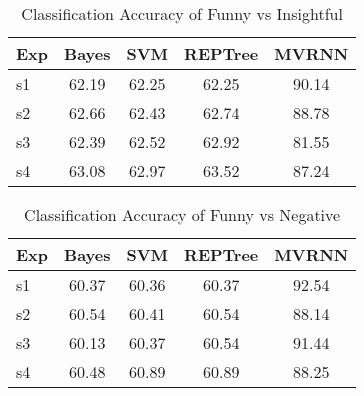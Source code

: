 \documentclass{acm_proc_article-sp}
\begin{document}
\begin{table}[t]
\caption{\label{}Classification Accuracy of Funny vs Insightful }

\vspace{8pt} %

\centering
\begin{tabular}{|l |c |c| c| c|}
\hline%
Exp & Bayes & SVM & REPTree & MVRNN  \\
                 
\hline

s1 & 62.19 & 62.25 &62.25 & 90.14 \\
\hline
s2 & 62.66 & 62.43 &62.74 & 88.78 \\
\hline
s3 & 62.39 & 62.52 &62.92 & 81.55 \\
\hline
s4 & 63.08 & 62.97 &63.52 & 87.24 \\
\hline



\end{tabular}
\end{table}



\begin{table}[t]
\caption{\label{}Classification Accuracy of Funny vs Negative }

\vspace{8pt} %

\centering
\begin{tabular}{|l |c |c| c| c|}
\hline%
Exp & Bayes & SVM & REPTree & MVRNN  \\
                 
\hline

s1 & 60.37 & 60.36 &60.37 & 92.54 \\
\hline
s2 & 60.54 & 60.41  &60.54 & 88.14 \\
\hline
s3 & 60.13 & 60.37 &60.54 & 91.44\\
\hline
s4 & 60.48 & 60.89 &60.89 & 88.25 \\
\hline



\end{tabular}
\end{table}
\end{document}

